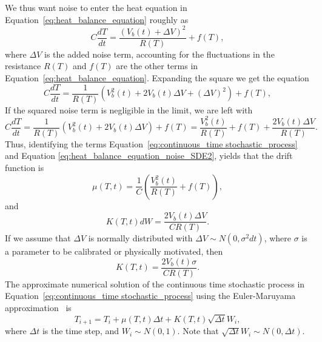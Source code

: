 We thus want noise to enter the heat equation in Equation~\eqref{eq:heat_balance_equation}
roughly as
\begin{equation}
  \label{eq:heat_balance_equation_noise}
  C\frac{dT}{dt}=\frac{(V_b(t) + \Delta V)^2}{R(T)}+ f(T),
\end{equation}
where $\Delta V$ is the added noise term, accounting for the
fluctuations in the resistance $R(T)$ and $f(T)$ are the other terms
in Equation~\eqref{eq:heat_balance_equation}.
Expanding the square we get the equation
\begin{equation}
  \label{eq:heat_balance_equation_noise_SDE1}
  C\frac{dT}{dt}=\frac{1}{R(T)} (V_b^2(t) + 2 V_b(t) \Delta V + (\Delta V)^2) + f(T),
\end{equation}
If the squared noise term is negligible in the limit, we are left with
\begin{equation}
  \label{eq:heat_balance_equation_noise_SDE2}
  C\frac{dT}{dt}=\frac{1}{R(T)} (V_b^2(t) + 2 V_b(t) \Delta V  ) +
  f(T) = \frac{V_b^2(t)}{R(T)} + f(T) +  \frac{2 V_b(t) \Delta V}{R(T)}.
\end{equation}
Thus, identifying the terms Equation~\eqref{eq:continuous_time stochastic_process} and Equation
\eqref{eq:heat_balance_equation_noise_SDE2}, yields that the drift
function is
\begin{equation}
  \label{eq:drift_function}
  \mu(T,t) = \frac{1}{C} \left( \frac{V_b^2(t)}{R(T)} + f(T) \right),
\end{equation}
and
\begin{equation}
  \label{eq:variance_function}
  K(T,t)dW = \frac{2 V_b(t) \Delta V}{CR(T)}.
\end{equation}
If we assume that $\Delta V$ is normally distributed with $\Delta V
\sim N(0, \sigma^2 dt)$, where $\sigma$ is a parameter to be calibrated or
physically motivated, then
\begin{equation}
  \label{eq:variance_function}
  K(T,t) = \frac{2 V_b(t) \sigma }{CR(T)}.
\end{equation}
The approximate numerical solution of the continuous time stochastic
process in Equation~\eqref{eq:continuous_time stochastic_process}
using the Euler-Maruyama approximation~\cite{3540540628} is
\begin{equation}
  \label{eq:euler_maruyama_method}
  T_{i+1}  = T_{i} + \mu(T,t) \Delta t  + K(T,t) \sqrt{\Delta t}W_i,
\end{equation}
where $\Delta t$ is the time step, and $W_i \sim N(0,1)$. Note
that $\sqrt{\Delta t}W_i \sim N(0, \Delta t)$.

